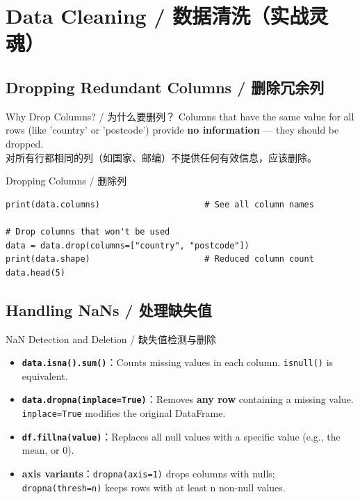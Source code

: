 \documentclass[11pt,a4paper]{article}
\begin{document}
\section{Data Cleaning / 数据清洗（实战灵魂）}

\subsection{Dropping Redundant Columns / 删除冗余列}

\begin{concept}{Why Drop Columns? / 为什么要删列？}
    Columns that have the same value for all rows (like 'country' or 'postcode') provide \textbf{no information} — they should be dropped. \\
    对所有行都相同的列（如国家、邮编）不提供任何有效信息，应该删除。
\end{concept}

\begin{examplebox}{Dropping Columns / 删除列}
\begin{lstlisting}
print(data.columns)                     # See all column names

# Drop columns that won't be used
data = data.drop(columns=["country", "postcode"])
print(data.shape)                       # Reduced column count
data.head(5)
\end{lstlisting}
\end{examplebox}

\subsection{Handling NaNs / 处理缺失值}

\begin{warning}{NaN Detection and Deletion / 缺失值检测与删除}
    \begin{itemize}[itemsep=0.8em]
        \item \textbf{\texttt{data.isna().sum()}}：Counts missing values in each column. \texttt{isnull()} is equivalent.
        \item \textbf{\texttt{data.dropna(inplace=True)}}：Removes \textbf{any row} containing a missing value. \texttt{inplace=True} modifies the original DataFrame.
        \item \textbf{\texttt{df.fillna(value)}}：Replaces all null values with a specific value (e.g., the mean, or 0).
        \item \textbf{axis variants}：\texttt{dropna(axis=1)} drops columns with nulls; \texttt{dropna(thresh=n)} keeps rows with at least n non-null values.
    \end{itemize}
\end{warning}
\end{document}
